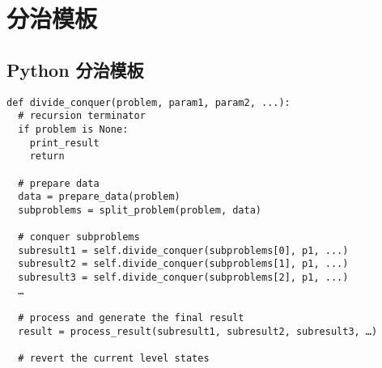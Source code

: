 \newpage
\section{分治模板}

\subsection{Python 分治模板}

\begin{verbatim}
def divide_conquer(problem, param1, param2, ...): 
  # recursion terminator 
  if problem is None: 
    print_result 
    return 

  # prepare data 
  data = prepare_data(problem) 
  subproblems = split_problem(problem, data) 

  # conquer subproblems 
  subresult1 = self.divide_conquer(subproblems[0], p1, ...) 
  subresult2 = self.divide_conquer(subproblems[1], p1, ...) 
  subresult3 = self.divide_conquer(subproblems[2], p1, ...) 
  …

  # process and generate the final result 
  result = process_result(subresult1, subresult2, subresult3, …)
	
  # revert the current level states
\end{verbatim}
